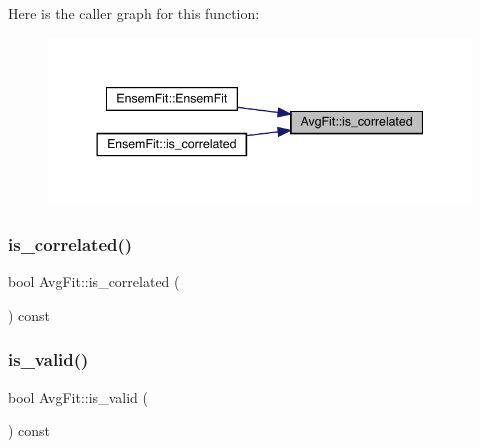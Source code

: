 Here is the caller graph for this function\+:
\nopagebreak
\begin{figure}[H]
\begin{center}
\leavevmode
\includegraphics[width=344pt]{d4/dfd/classAvgFit_af828c76e39fea9326e2828e176abb1c4_icgraph}
\end{center}
\end{figure}
\mbox{\label{classAvgFit_af828c76e39fea9326e2828e176abb1c4}} 
\subsubsection{\texorpdfstring{is\_correlated()}{is\_correlated()}\hspace{0.1cm}{\footnotesize\ttfamily [2/2]}}
{\footnotesize\ttfamily bool Avg\+Fit\+::is\+\_\+correlated (\begin{DoxyParamCaption}{ }\end{DoxyParamCaption}) const\hspace{0.3cm}{\ttfamily [inline]}}

\mbox{\label{classAvgFit_a9a906abeb09e724f98fc8b77aff0ea6d}} 
\subsubsection{\texorpdfstring{is\_valid()}{is\_valid()}\hspace{0.1cm}{\footnotesize\ttfamily [1/2]}}
{\footnotesize\ttfamily bool Avg\+Fit\+::is\+\_\+valid (\begin{DoxyParamCaption}{ }\end{DoxyParamCaption}) const\hspace{0.3cm}{\ttfamily [inline]}}

\mbox{\label{classAvgFit_a9a906abeb09e724f98fc8b77aff0ea6d}} 
